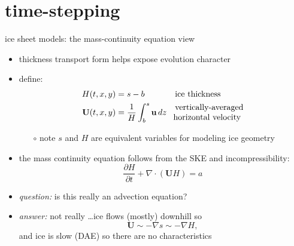 \documentclass[svgnames,
               hyperref={colorlinks,citecolor=DeepPink4,linkcolor=FireBrick,urlcolor=Maroon},
               usepdftitle=false]  %
               {beamer}
\newcommand{\grad}{\nabla}
\newcommand{\bu}{\mathbf{u}}
\newcommand{\bU}{\mathbf{U}}
\begin{document}

\section{time-stepping}

\begin{frame}{ice sheet models: the mass-continuity equation view}

\begin{itemize}
\item thickness transport form helps expose evolution character
\item define:
\begin{align*}
H(t,x,y) &=s-b && \text{ice thickness} \\
\bU(t,x,y) &= \frac{1}{H} \int_b^s \bu \,dz && \begin{matrix} \text{vertically-averaged} \\ \hspace{-1.8mm} \text{horizontal velocity} \end{matrix}
\end{align*}

    \begin{itemize}
    \item[$\circ$] note $s$ and $H$ are equivalent variables for modeling ice geometry
    \end{itemize}
\item<2-> the \alert{mass continuity equation} follows from the SKE and incompressibility:
   $$\frac{\partial H}{\partial t} + \nabla \cdot \left(\bU H\right) = a$$

\smallskip
\item<3-> \emph{question:} is this really an advection equation?
\item<3->[] \emph{answer:} not really \dots ice flows (mostly) downhill so
  $$\bU \sim - \grad s \sim - \grad H,$$
and ice is slow (DAE) so there are no characteristics
\end{itemize}
\end{frame}
\end{document}
